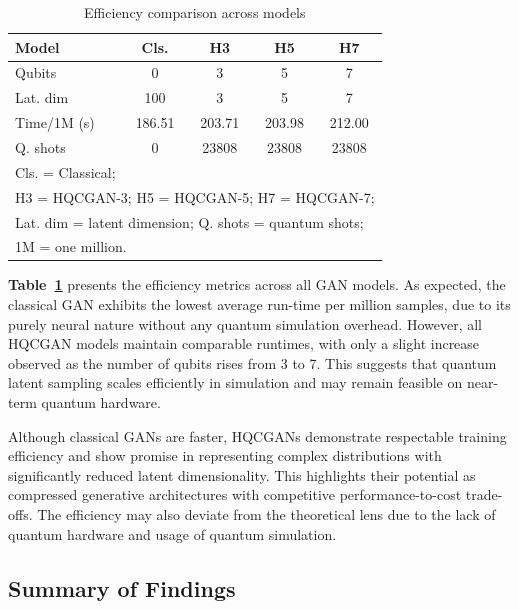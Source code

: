 \documentclass[conference]{IEEEtran}
\begin{document}
\begin{table}[htbp]
\caption{Efficiency comparison across models}
\begin{center}
\begin{tabular}{|l|c|c|c|c|}
\hline
\textbf{Model} & \textbf{Cls.} & \textbf{H3} & \textbf{H5} & \textbf{H7} \\
\hline
Qubits & 0 & 3 & 5 & 7 \\
Lat. dim & 100 & 3 & 5 & 7 \\
Time/1M (s) & 186.51 & 203.71 & 203.98 & 212.00 \\
Q. shots & 0 & 23808 & 23808 & 23808 \\
\hline
\multicolumn{5}{l}{\footnotesize{Cls. = Classical;}}\\
\multicolumn{5}{l}{\footnotesize{H3 = HQCGAN-3; H5 = HQCGAN-5; H7 = HQCGAN-7;}} \\
\multicolumn{5}{l}{\footnotesize{Lat. dim = latent dimension; Q. shots = quantum shots;}} \\
\multicolumn{5}{l}{\footnotesize{1M = one million.}}
\end{tabular}
\label{tab:efficiency_comparison}
\end{center}
\end{table}



\textbf{Table~\ref{tab:efficiency_comparison}} presents the efficiency metrics across all GAN models. As expected, the classical GAN exhibits the lowest average run-time per million samples, due to its purely neural nature without any quantum simulation overhead. However, all HQCGAN models maintain comparable runtimes, with only a slight increase observed as the number of qubits rises from 3 to 7. This suggests that quantum latent sampling scales efficiently in simulation and may remain feasible on near-term quantum hardware.

Although classical GANs are faster, HQCGANs demonstrate respectable training efficiency and show promise in representing complex distributions with significantly reduced latent dimensionality. This highlights their potential as compressed generative architectures with competitive performance-to-cost trade-offs. The efficiency may also deviate from the theoretical lens due to the lack of quantum hardware and usage of quantum simulation.

\subsection{Summary of Findings}
\end{document}
